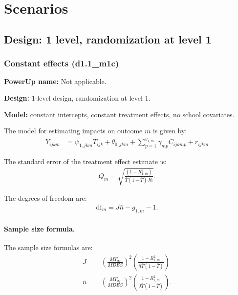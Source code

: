 \documentclass[12pt]{article}
\begin{document}

\newpage
\section{Scenarios}

\subsection{Design: 1 level, randomization at level 1}

\subsubsection{Constant effects (d1.1\_m1c)}

\textbf{PowerUp name:} Not applicable.

\textbf{Design:} 1-level design, randomization at level 1.

\textbf{Model:} constant intercepts, constant treatment effects, no school covariates.

The model for estimating impacts on outcome $m$ is given by:
\begin{align}
Y_{ijkm} &= \psi_{1,jkm} T_{ijk} + \theta_{0,jkm} + \sum_{p=1}^{g_{1,m}} \gamma_{mp} C_{ijkmp} + r_{ijkm}
\end{align}

The standard error of the treatment effect estimate is:
\begin{align} Q_m = \sqrt{\frac{(1-R^2_{1,m})}{\bar{T}(1 - \bar{T}) J \bar{n}}} . \end{align}

The degrees of freedom are:
\begin{align}\text{df}_m = J \bar{n} - g_{1,m} - 1.\end{align}

\paragraph{Sample size formula.} 
The sample size formulas are:
\begin{align}
J &= \left(\frac{MT_{df}}{MDES}\right)^2 \left(\frac{1-R^2_{1,m}}{\bar{n} \bar{T} (1 - \bar{T})} \right)\\
\bar{n} &= \left(\frac{MT_{df}}{MDES}\right)^2 \left(\frac{1-R^2_{1,m}}{J \bar{T} (1 - \bar{T})} \right) .
\end{align}
\end{document}

